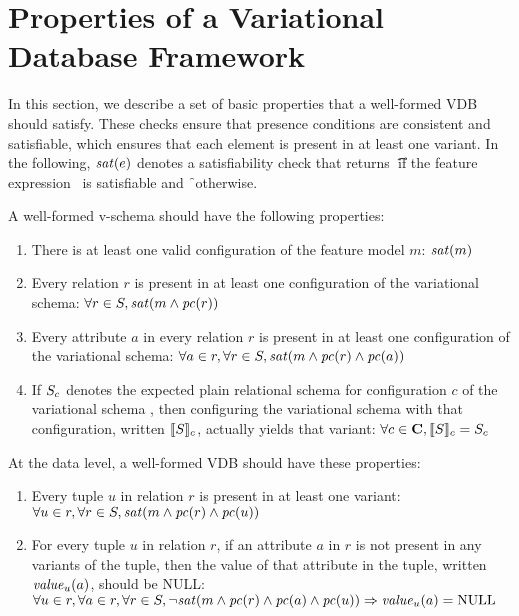 \section{Properties of a Variational Database Framework}
\label{sec:vdbfprop}





In this section, we describe a set of basic properties that a well-formed VDB
should satisfy.
%
These checks ensure that presence conditions are consistent and satisfiable,
which ensures that each element is present in at least one variant.
%
In the following, $\sat\dimMeta$ denotes a satisfiability check
that returns \t\ if the feature expression \dimMeta\ is satisfiable and \f\
otherwise.


A well-formed v-schema should have the following properties:
%
\begin{enumerate}
%
\item There is at least one valid configuration of the feature model $m$:
%
$\sat\fModel$
%
\item Every relation $r$ is present in at least one configuration of the
variational schema:
%
$\forall\vRel\in\vSch, \sat{\fModel\wedge\getPC\vRel}$
%
\item Every attribute $a$ in every relation $r$ is present in at least one
configuration of the variational schema:
%
$\forall\vAtt\in\vRel, \forall\vRel\in\vSch,
\sat{\fModel\wedge\getPC\vRel\wedge\getPC\vAtt}$
%
\item If $\vSch_\config$ denotes the expected plain relational schema for
configuration $c$ of the variational schema \vSch, then configuring the
variational schema with that configuration, written $\sem[\config]{\vSch}$,
actually yields that variant:
%
$\forall\config\in\confSet, \sem[\config]{\vSch} = \vSch_\config$
%
\end{enumerate}


\noindent
%
At the data level, a well-formed VDB should have these properties:
%
\begin{enumerate}
%
\item Every tuple $u$ in relation $r$ is present in at least one variant:
%
$\forall\vTuple\in\vRel, \forall\vRel\in\vSch,
\sat{\fModel\wedge\getPC\vRel\wedge\getPC\vTuple}$ 
%
\item For every tuple $u$ in relation $r$, if an attribute $a$ in $r$ is
not present in any variants of the tuple, then the value of that attribute in
the tuple, written $\mathit{value}_\vTuple(\vAtt)$, should be NULL:
$\forall\vTuple\in\vRel, \forall\vAtt\in\vRel, \forall\vRel\in\vSch,
\neg\sat{\fModel\wedge\getPC\vRel\wedge\getPC\vAtt\wedge\getPC\vTuple}
\Rightarrow \mathit{value}_\vTuple(\vAtt) = \text{NULL}$
%
\end{enumerate}


